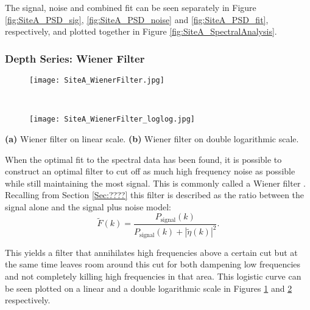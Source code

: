\documentclass[../../CompleteThesis/Complete_1stDraft.tex]{subfiles}
\begin{document}
	The signal, noise and combined fit can be seen separately in Figure \ref{fig:SiteA_PSD_sig}, \ref{fig:SiteA_PSD_noise} and \ref{fig:SiteA_PSD_fit}, respectively, and plotted together in Figure \ref{fig:SiteA_SpectralAnalysis}.
	
	
	\subsubsection[Wiener Filter]{Depth Series: Wiener Filter}
	\label{Subsubsec:Method_FirstSigmaEstimate_BackDiffusion_WienerFilter}
	
	\begin{marginfigure}
		\centering
		\begin{subfigure}{\marginparwidth}
			\centering
			\texttt{[image: SiteA\_WienerFilter.jpg]}
			\caption{\footnotesize}
			\label{fig:SiteA_WienerFilter}
		\end{subfigure}\\[1ex]
		
		\begin{subfigure}{\marginparwidth}
			\centering
			\texttt{[image: SiteA\_WienerFilter\_loglog.jpg]}
			\caption{\footnotesize}
			\label{fig:SiteA_WienerFilter_loglog}
		\end{subfigure}
		\caption[Wiener filter]{\footnotesize\textbf{(a)} Wiener filter on linear scale. \textbf{(b)} Wiener filter on double logarithmic scale.}
		\label{fig:SiteA_WienerFilters}
	\end{marginfigure}
	When the optimal fit to the spectral data has been found, it is possible to construct an optimal filter to cut off as much high frequency noise as possible while still maintaining the most signal. This is commonly called a Wiener filter . Recalling from Section \ref{Sec:????} this filter is described as the ratio between the signal alone and the signal plus noise model:
	\begin{equation}
		\tilde{F}(k) = \frac{P_{\text{signal}}(k)}{P_{\text{signal}}(k) + |\tilde{\eta}(k)|^2}.
		\label{Eq:MethodWienerFilter}
	\end{equation}
	
	This yields a filter that annihilates high frequencies above a certain cut but at the same time leaves room around this cut for both dampening low frequencies and not completely killing high frequencies  in that area. 
	This logistic curve can be seen plotted on a linear and a double logarithmic scale in Figures \ref{fig:SiteA_WienerFilter} and \ref{fig:SiteA_WienerFilter_loglog} respectively.
	
\end{document}
